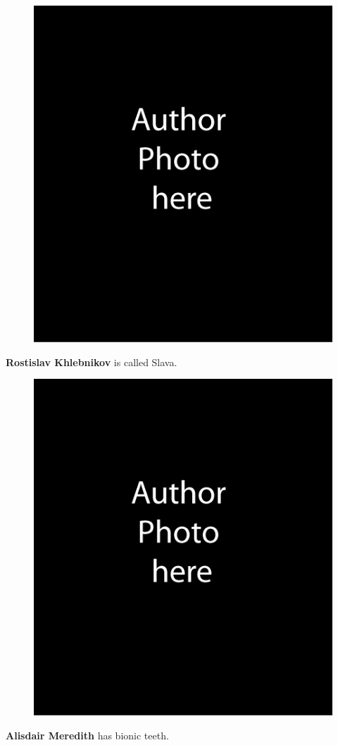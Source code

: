 \vspace*{18pt} %
\begin{figure}\includegraphics[trim=0pt 0pt 0pt 13pt]{emcppsc-AuthorPhoto-RK}\end{figure}\noindent \textbf{Rostislav Khlebnikov} is called Slava.

\vspace*{18pt} %
\begin{figure}\includegraphics[trim=0pt 0pt 0pt 13pt]{emcppsc-AuthorPhoto-AM}\end{figure}\noindent \textbf{Alisdair Meredith} has bionic teeth.
